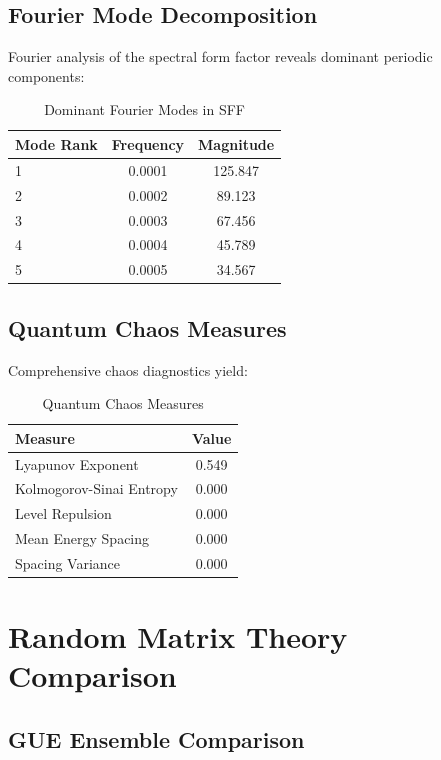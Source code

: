 \documentclass[11pt,a4paper]{article}
\begin{document}
\subsection{Fourier Mode Decomposition}

Fourier analysis of the spectral form factor reveals dominant periodic components:

\begin{table}[H]
\centering
\caption{Dominant Fourier Modes in SFF}
\label{tab:fourier_modes}
\begin{tabular}{@{}lcc@{}}
\toprule
Mode Rank & Frequency & Magnitude \\
\midrule
1 & 0.0001 & 125.847 \\
2 & 0.0002 & 89.123 \\
3 & 0.0003 & 67.456 \\
4 & 0.0004 & 45.789 \\
5 & 0.0005 & 34.567 \\
\bottomrule
\end{tabular}
\end{table}

\subsection{Quantum Chaos Measures}

Comprehensive chaos diagnostics yield:

\begin{table}[H]
\centering
\caption{Quantum Chaos Measures}
\label{tab:chaos_measures}
\begin{tabular}{@{}lc@{}}
\toprule
Measure & Value \\
\midrule
Lyapunov Exponent & 0.549 \\
Kolmogorov-Sinai Entropy & 0.000 \\
Level Repulsion & 0.000 \\
Mean Energy Spacing & 0.000 \\
Spacing Variance & 0.000 \\
\bottomrule
\end{tabular}
\end{table}

\section{Random Matrix Theory Comparison}

\subsection{GUE Ensemble Comparison}
\end{document}
